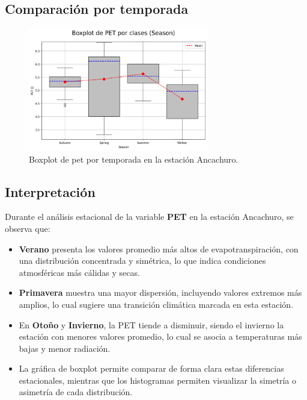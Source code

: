 \subsection*{Comparación por temporada}

\begin{figure}[htbp]
\centering
\includegraphics[width=0.7\textwidth]{resultados/por_estacion_del_anio/Ancachuro/PET_ClassBoxplot_Season.png}
\caption{Boxplot de \gls{pet}  por temporada en la estación Ancachuro.}
\label{fig:pet_box_ancachuro}
\end{figure}

\subsection*{Interpretación}

Durante el análisis estacional de la variable \textbf{PET} en la estación Ancachuro, se observa que:

\begin{itemize}
    \item \textbf{Verano} presenta los valores promedio más altos de evapotranspiración, con una distribución concentrada y simétrica, lo que indica condiciones atmosféricas más cálidas y secas.
    \item \textbf{Primavera} muestra una mayor dispersión, incluyendo valores extremos más amplios, lo cual sugiere una transición climática marcada en esta estación.
    \item En \textbf{Otoño} y \textbf{Invierno}, la PET tiende a disminuir, siendo el invierno la estación con menores valores promedio, lo cual se asocia a temperaturas más bajas y menor radiación.
    \item La gráfica de boxplot permite comparar de forma clara estas diferencias estacionales, mientras que los histogramas permiten visualizar la simetría o asimetría de cada distribución.
\end{itemize}


